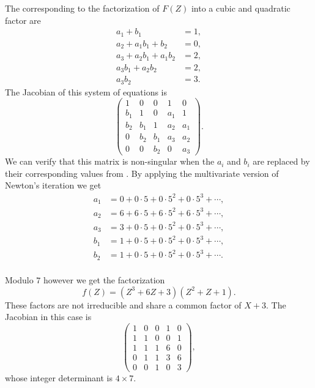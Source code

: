 The  corresponding to the factorization of
$F(Z)$ into a cubic and quadratic factor are
\begin{equation} \label{MNewton:Sing:Eq}
\begin{aligned}
a_1 + b_1 & = 1, \\
a_2 + a_1 b_1 + b_2 & = 0, \\
a_3 + a_2 b_1 + a_1 b_2 & = 2, \\
a_3 b_1 + a_2 b_2 & = 2, \\
a_3 b_2 & = 3.
\end{aligned}
\end{equation}
The Jacobian of this system of equations is 
\[
\left(
\begin{array}{ccccc}
1 & 0 & 0 & 1 & 0 \\
b_1 & 1 & 0 & a_1 & 1 \\
b_2 & b_1 & 1 & a_2 & a_1 \\
0   & b_2 & b_1 & a_3 & a_2 \\
0   & 0   & b_2 & 0   & a_3
\end{array}
\right).
\]
We can verify that this matrix is non-singular when the $a_i$ and
$b_i$ are replaced by their corresponding values from
.  By applying the multivariate version of Newton's
iteration  we get 
\[
\begin{aligned}
a_1 & = 0 + 0\cdot 5 + 0 \cdot 5^2 + 0 \cdot 5^3 + \cdots, \\
a_2 & = 6 + 6\cdot 5 + 6 \cdot 5^2 + 6 \cdot 5^3 + \cdots, \\
a_3 & = 3 + 0\cdot 5 + 0 \cdot 5^2 + 0 \cdot 5^3 + \cdots, \\
b_1 & = 1 + 0\cdot 5 + 0 \cdot 5^2 + 0 \cdot 5^3 + \cdots, \\
b_2 & = 1 + 0\cdot 5 + 0 \cdot 5^2 + 0 \cdot 5^3 + \cdots. \\
\end{aligned}
\]

Modulo $7$ however we get the factorization
\[
f(Z) = (Z^3 + 6 Z + 3) (Z^2 +  Z + 1).
\]
These factors are not irreducible and share a common factor of
$X+3$.  The Jacobian in this case is 
\[
\left(
\begin{array}{ccccc}
1 & 0 & 0 & 1 & 0 \\
1 & 1 & 0 & 0 & 1 \\
1 & 1 & 1 & 6 & 0 \\
0 & 1 & 1 & 3 & 6 \\
0 & 0 & 1 & 0 & 3
\end{array}
\right),
\]
whose integer determinant is $4 \times 7$.

